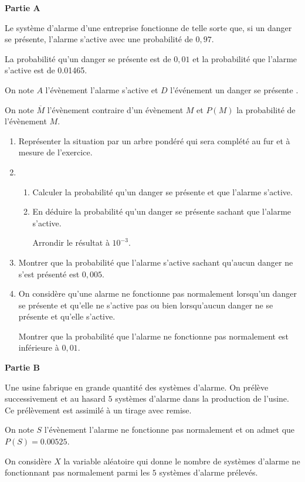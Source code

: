 \textbf{Partie A}

\medskip

Le système d'alarme d'une entreprise fonctionne de telle sorte que, si un danger se présente, l'alarme s'active avec une probabilité de $0,97$. 

La probabilité qu'un danger se présente est de $0,01$ et la probabilité que l'alarme s'active est de \num{0,01465}.

On note $A$ l'évènement \og  l'alarme s'active \fg{}  et $D$ l'événement \og  un danger se présente \fg . 

On note $\overline{M}$ l'évènement contraire d'un évènement $M$ et $P(M)$ la probabilité de l'évènement $M$.

\begin{enumerate}
	\item Représenter la situation par un arbre pondéré qui sera complété au fur et à mesure de l'exercice.
	\item  
	\begin{enumerate}
		\item Calculer la probabilité qu'un danger se présente et que l'alarme s'active.
		\item En déduire la probabilité qu'un danger se présente sachant que l'alarme s'active.
		
		Arrondir le résultat à $10^{-3}$.
	\end{enumerate}
	\item  Montrer que la probabilité que l'alarme s'active sachant qu'aucun danger ne s'est présenté est $0,005$.
	\item On considère qu'une alarme ne fonctionne pas normalement lorsqu'un danger se présente et qu'elle ne s'active pas ou bien lorsqu'aucun danger ne se présente et qu'elle s'active.
	
	Montrer que la probabilité que l'alarme ne fonctionne pas normalement est inférieure à $0,01$.
\end{enumerate}

\textbf{Partie B}

\medskip

Une usine fabrique en grande quantité des systèmes d'alarme. On prélève successivement et au hasard $5$ systèmes d'alarme dans la production de l'usine. Ce prélèvement est assimilé à un tirage avec remise.

On note $S$ l'évènement \og l'alarme ne fonctionne pas normalement \fg{}  et on admet que $P(S) = \num{0,00525}$.

On considère $X$ la variable aléatoire qui donne le nombre de systèmes d'alarme ne fonctionnant pas normalement parmi les $5$ systèmes d'alarme prélevés.

